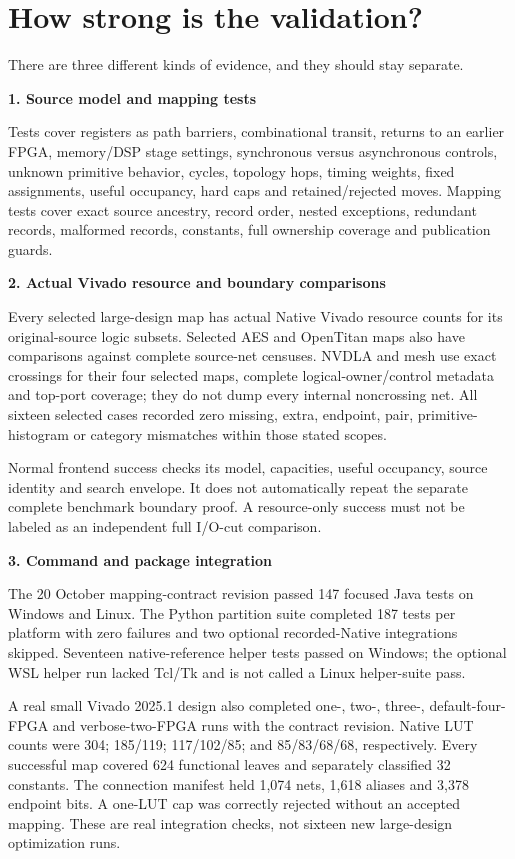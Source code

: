 \documentclass[11pt]{article}
\newcommand{\heading}[1]{\textbf{#1}\par}
\begin{document}
\section{How strong is the validation?}

There are three different kinds of evidence, and they should stay separate.

\heading{1. Source model and mapping tests}
Tests cover registers as path barriers, combinational transit, returns to an earlier FPGA, memory/DSP stage settings, synchronous versus asynchronous controls, unknown primitive behavior, cycles, topology hops, timing weights, fixed assignments, useful occupancy, hard caps and retained/rejected moves. Mapping tests cover exact source ancestry, record order, nested exceptions, redundant records, malformed records, constants, full ownership coverage and publication guards.

\heading{2. Actual Vivado resource and boundary comparisons}
Every selected large-design map has actual Native Vivado resource counts for its original-source logic subsets. Selected AES and OpenTitan maps also have comparisons against complete source-net censuses. NVDLA and mesh use exact crossings for their four selected maps, complete logical-owner/control metadata and top-port coverage; they do not dump every internal noncrossing net. All sixteen selected cases recorded zero missing, extra, endpoint, pair, primitive-histogram or category mismatches within those stated scopes.

Normal frontend success checks its model, capacities, useful occupancy, source identity and search envelope. It does not automatically repeat the separate complete benchmark boundary proof. A resource-only success must not be labeled as an independent full I/O-cut comparison.

\heading{3. Command and package integration}
The 20 October mapping-contract revision passed 147 focused Java tests on Windows and Linux. The Python partition suite completed 187 tests per platform with zero failures and two optional recorded-Native integrations skipped. Seventeen native-reference helper tests passed on Windows; the optional WSL helper run lacked Tcl/Tk and is not called a Linux helper-suite pass.

A real small Vivado 2025.1 design also completed one-, two-, three-, default-four-FPGA and verbose-two-FPGA runs with the contract revision. Native LUT counts were 304; 185/119; 117/102/85; and 85/83/68/68, respectively. Every successful map covered 624 functional leaves and separately classified 32 constants. The connection manifest held 1,074 nets, 1,618 aliases and 3,378 endpoint bits. A one-LUT cap was correctly rejected without an accepted mapping. These are real integration checks, not sixteen new large-design optimization runs.
\end{document}
